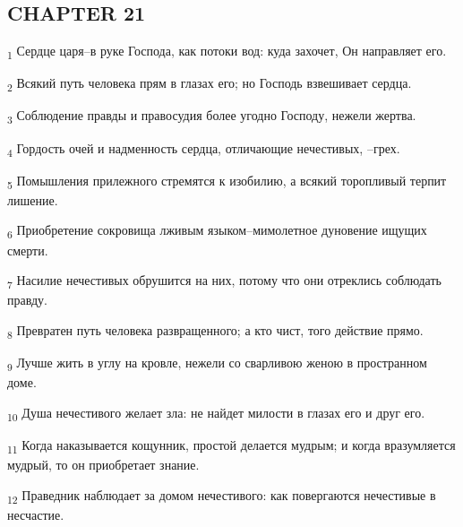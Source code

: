 \subsection{CHAPTER 21}
\begin{tcolorbox}
\textsubscript{1} Сердце царя--в руке Господа, как потоки вод: куда захочет, Он направляет его.
\end{tcolorbox}
\begin{tcolorbox}
\textsubscript{2} Всякий путь человека прям в глазах его; но Господь взвешивает сердца.
\end{tcolorbox}
\begin{tcolorbox}
\textsubscript{3} Соблюдение правды и правосудия более угодно Господу, нежели жертва.
\end{tcolorbox}
\begin{tcolorbox}
\textsubscript{4} Гордость очей и надменность сердца, отличающие нечестивых, --грех.
\end{tcolorbox}
\begin{tcolorbox}
\textsubscript{5} Помышления прилежного стремятся к изобилию, а всякий торопливый терпит лишение.
\end{tcolorbox}
\begin{tcolorbox}
\textsubscript{6} Приобретение сокровища лживым языком--мимолетное дуновение ищущих смерти.
\end{tcolorbox}
\begin{tcolorbox}
\textsubscript{7} Насилие нечестивых обрушится на них, потому что они отреклись соблюдать правду.
\end{tcolorbox}
\begin{tcolorbox}
\textsubscript{8} Превратен путь человека развращенного; а кто чист, того действие прямо.
\end{tcolorbox}
\begin{tcolorbox}
\textsubscript{9} Лучше жить в углу на кровле, нежели со сварливою женою в пространном доме.
\end{tcolorbox}
\begin{tcolorbox}
\textsubscript{10} Душа нечестивого желает зла: не найдет милости в глазах его и друг его.
\end{tcolorbox}
\begin{tcolorbox}
\textsubscript{11} Когда наказывается кощунник, простой делается мудрым; и когда вразумляется мудрый, то он приобретает знание.
\end{tcolorbox}
\begin{tcolorbox}
\textsubscript{12} Праведник наблюдает за домом нечестивого: как повергаются нечестивые в несчастие.
\end{tcolorbox}
